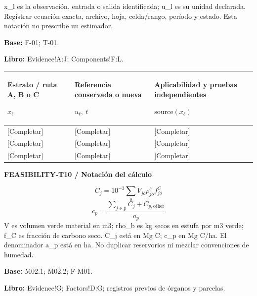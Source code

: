 x\_l es la observación, entrada o salida identificada; u\_l es su unidad declarada. Registrar ecuación exacta, archivo, hoja, celda/rango, período y estado. Esta notación no prescribe un estimador.\par
\textbf{Base:} F-01; T-01.\par
\textbf{Libro:} Evidence!A:J; Components!F:L.\par\endgroup
{\sffamily\fontsize{8.3}{10.3}\selectfont\begin{longtable}{@{}P{51.14mm} P{59.39mm} P{54.44mm}@{}}
\toprule
\textbf{Estrato / ruta A, B o C}\par {\normalfont\fontsize{8.2}{10}\selectfont $x_{\ell}$} & \textbf{Referencia conservada o nueva}\par {\normalfont\fontsize{8.2}{10}\selectfont $u_{\ell},\ t$} & \textbf{Aplicabilidad y pruebas independientes}\par {\normalfont\fontsize{8.2}{10}\selectfont $\text{source}(x_{\ell})$}\\\midrule\endhead
\rule{0pt}{7.7mm}[Completar] & [Completar] & [Completar]\\\hline
\rule{0pt}{7.7mm}[Completar] & [Completar] & [Completar]\\\hline
\rule{0pt}{7.7mm}[Completar] & [Completar] & [Completar]\\\hline
\end{longtable}}
\par\begingroup\sffamily\fontsize{8}{10}\selectfont\color{NEBGreen}\setlength{\parskip}{2pt}\setlength{\abovedisplayskip}{4pt}\setlength{\belowdisplayskip}{4pt}\setlength{\abovedisplayshortskip}{2pt}\setlength{\belowdisplayshortskip}{3pt}
\textbf{FEASIBILITY-T10 / Notación del cálculo}\par
{\fontsize{9}{11}\selectfont\[ C_j=10^{-3}\sum_o V_{jo}\rho^b_{jo}f^C_{jo} \]}
{\fontsize{9}{11}\selectfont\[ c_p=\frac{\sum_{j\in p}C_j+C_{p,\mathrm{other}}}{a_p} \]}
V es volumen verde material en m3; rho\_b es kg secos en estufa por m3 verde; f\_C es fracción de carbono seco. C\_j está en Mg C; c\_p en Mg C/ha. El denominador a\_p está en ha. No duplicar reservorios ni mezclar convenciones de humedad.\par
\textbf{Base:} M02.1; M02.2; F-M01.\par
\textbf{Libro:} Evidence!G; Factors!D:G; registros previos de órganos y parcelas.\par\endgroup
